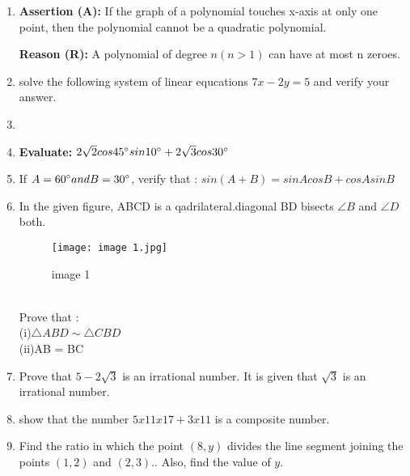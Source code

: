 \documentclass{article}
\begin{document}
\begin{enumerate}
\item \textbf{Assertion (A):} If the graph of a polynomial touches x-axis at only one point, then the polynomial cannot be a quadratic polynomial.

\textbf{Reason (R):} A polynomial of degree $n(n >1)$ can have at most n zeroes.
\item solve the following system of linear equcations $7x-2y=5$ and verify your answer.
\item{}

\item\textbf{ Evaluate:} $2\sqrt{2} cos 45\degree sin 10\degree + 2\sqrt{3} cos 30\degree$

\item If  $A = 60\degree and  B = 30\degree$, verify that : $sin(A + B) = sin A cos B + cos A sin B$
\newpage
\item In  the given figure, ABCD is a qadrilateral.diagonal BD bisects $\angle B$ and $\angle D$ both. 
\begin{figure}[h!]
\centering
\texttt{[image: image 1.jpg]}
\label{fig:image 1}
\caption{image 1}
\end{figure}\\
\text Prove that :\\	
		(i)$\triangle ABD \sim \triangle CBD $\\
		(ii)AB = BC
\item Prove that $ 5 - 2\sqrt{3}$ is an irrational number. It is given that $\sqrt{3}$  is an irrational number.

\item show that the number $5x11x17+3x11$ is a composite number.
\item Find the ratio in which the point $(8, y)$ divides the line segment joining the points $(1, 2)$ and $(2, 3)$.. Also, find the value of  $y$.


\end{enumerate}
\end{document}
